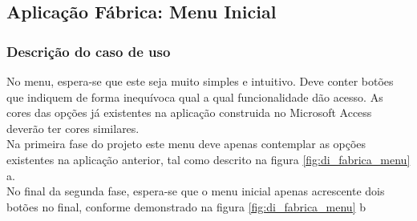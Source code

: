 \subsection{Aplicação Fábrica: Menu Inicial}
\subsubsection*{Descrição do caso de uso}
No menu, espera-se que este seja muito simples e intuitivo. Deve conter botões que indiquem de forma inequívoca qual a qual funcionalidade dão acesso. As cores das opções já existentes na aplicação construida no Microsoft Access deverão ter cores similares.\\
Na primeira fase do projeto este menu deve apenas contemplar as opções existentes na aplicação anterior, tal como descrito na figura \ref{fig:di_fabrica_menu} a.\\
No final da segunda fase, espera-se que o menu inicial apenas acrescente dois botões no final, conforme demonstrado na figura \ref{fig:di_fabrica_menu} b

